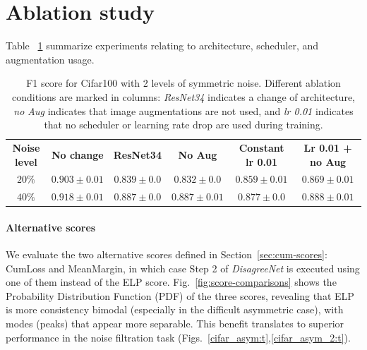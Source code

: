 \documentclass{article}
\begin{document}
\section{Ablation study}
\label{app:ablationstudy}

Table ~\ref{Table:ablation_secondry} summarize experiments relating to architecture, scheduler,
and augmentation usage.
\begin{table}[h]
  \caption{F1 score for Cifar100 with 2 levels of symmetric noise. Different ablation conditions are marked in columns: \emph{ResNet34} indicates a change of architecture, \emph{no Aug} indicates that image augmentations are not used, and \emph{lr 0.01} indicates that no scheduler or learning rate drop are used during training.}
  \label{Table:ablation_secondry}
\vspace{-1em}
\small
  \centering
  \begin{tabular}{c|  c|c|c|c|c}
    & & & & &\\ 
    \toprule
    \textbf{Noise level} & \textbf{No change} & \textbf{ResNet34} &  \textbf{No Aug} &  \textbf{Constant lr 0.01} &  \textbf{Lr 0.01 + no Aug} \\ 
    
    \midrule
    $20\%$ &$0.903 \pm 0.01$ &$0.839 \pm 0.0$ &$0.832 \pm 0.0$ &$0.859 \pm 0.01$ & $0.869 \pm 0.01$\\
    $40\%$ &$0.918 \pm 0.01$ &$0.887 \pm 0.0$ &$0.887 \pm 0.01$ &$0.877 \pm 0.0$ &$0.888 \pm 0.01$\\
    \hline
    \bottomrule
  \end{tabular}
\end{table}



\paragraph{Alternative scores}

We evaluate the two alternative scores defined in Section~\ref{sec:cum-scores}: CumLoss and MeanMargin, in which case Step 2 of \emph{DisagreeNet} is executed using one of them instead of the ELP score.  Fig.~\ref{fig:score-comparisons} shows the Probability Distribution Function (PDF) of the three scores, revealing that ELP is more consistency bimodal (especially in the difficult asymmetric case), with modes (peaks) that appear more separable. This  benefit translates to superior performance in the noise filtration task (Figs.~\ref{cifar_asym:t},\ref{cifar_asym_2:t}). 
\end{document}
